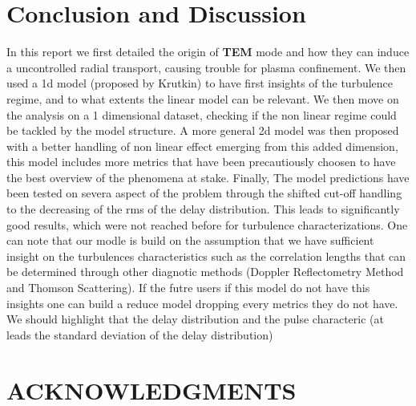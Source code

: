 \documentclass[11pt,a4paper,openany]{report}
\begin{document}
\begin{multicols}{2}
    \chapter{Conclusion and Discussion}
    In this report we first detailed the origin of \textbf{TEM} mode and how they can induce a uncontrolled radial transport, causing trouble for plasma confinement. We then used a 1d model (proposed by Krutkin) to have first insights of the turbulence regime, and to what extents the linear model can be relevant. We then move on the analysis on a 1 dimensional dataset, checking if the non linear regime could be tackled by the model structure. A more general 2d model was then proposed with a better handling of non linear effect emerging from this added dimension, this model includes more metrics that have been precautiously choosen to have the best overview of the phenomena at stake. Finally, The model predictions have been tested on severa aspect of the problem through the shifted cut-off handling to the decreasing of the rms of the delay distribution. This leads to significantly good results, which were not reached before for turbulence characterizations. One can note that our modle is build on the assumption that we have sufficient insight on the turbulences characteristics such as the correlation lengths that can be determined through other diagnotic methods (Doppler Reflectometry Method and Thomson Scattering). If the futre users if this model do not have this insights one can build a reduce model dropping every metrics they do not have. We should highlight that the delay distribution and the pulse characteric (at leads the standard deviation of the delay distribution)
    \chapter{ACKNOWLEDGMENTS}
\end{multicols}
\newpage
\begin{multicols}{2}
    \newpage
    \nocite{*}
    \printbibliography
\end{multicols}
\end{document}
